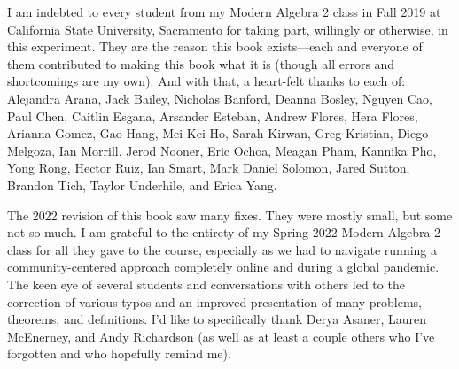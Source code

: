 \documentclass[12pt,oneside]{book}
\theoremstyle{definition}
\begin{document}
\medskip

\noindent I am  indebted to every student from my Modern Algebra 2 class in Fall 2019 at California State University, Sacramento for taking part, willingly or otherwise, in this experiment. They are the reason this book exists---each and everyone of them contributed to making this book what it is (though all errors and shortcomings are my own). And with that, a heart-felt thanks to each of: Alejandra Arana, Jack Bailey, Nicholas Banford, Deanna Bosley, Nguyen Cao, Paul Chen, Caitlin Esgana, Arsander Esteban, Andrew Flores, Hera Flores, Arianna Gomez, Gao Hang, Mei Kei Ho, Sarah Kirwan, Greg Kristian, Diego Melgoza, Ian Morrill, Jerod Nooner, Eric Ochoa, Meagan Pham, Kannika Pho, Yong Rong, Hector Ruiz, Ian Smart, Mark Daniel Solomon, Jared Sutton, Brandon Tich, Taylor Underhile, and Erica Yang. 

\medskip

\noindent The 2022 revision of this book saw many fixes. They were mostly small, but some not so much. I am grateful to the entirety of my Spring 2022 Modern Algebra 2 class for all they gave to the course, especially as we had to navigate running a community-centered approach completely online and during a global pandemic. The keen eye of several students and conversations with others led to the correction of various typos and an improved presentation of many problems, theorems, and definitions. I'd like to specifically thank Derya Asaner, Lauren McEnerney, and Andy Richardson (as well as at least a couple others who I've forgotten and who hopefully remind me).



\tableofcontents









\appendix

\end{document}
